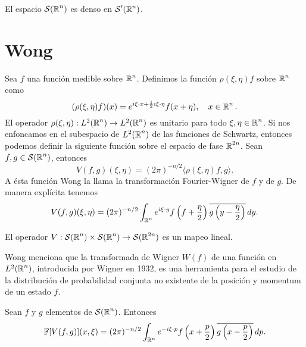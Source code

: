   \begin{proposition}
    El espacio $\operatorname{\mathcal S}(\operatorname{\mathbb{R}}^{n})$ es denso en $\operatorname{\mathcal S}'(\operatorname{\mathbb{R}}^{n})$.
  \end{proposition}

  \section{Wong}

  Sea $f$ una función medible sobre $\operatorname{\mathbb{R}}^{n}$. Definimos la
  función $\rho(\xi,\eta)f$ sobre $\operatorname{\mathbb{R}}^{n}$ como
  \begin{equation}
    (\rho(\xi,\eta)f)(x)
    = e^{i\xi \cdot x + \frac{1}{2} i \xi \cdot \eta}
    f(x+\eta),
    \quad x \in \operatorname{\mathbb{R}}^{n}.
  \end{equation}
  El operador $\rho(\xi,\eta) : L^2(\operatorname{\mathbb{R}}^{n}) \to L^2(\operatorname{\mathbb{R}}^{n})$
  es unitario para todo $\xi, \eta \in \operatorname{\mathbb{R}}^{n}$. Si nos
  enfoncamos en el subespacio de $L^2(\operatorname{\mathbb{R}}^{n})$ de las
  funciones de Schwartz, entonces podemos definir la
  siguiente función sobre el espacio de fase $\operatorname{\mathbb{R}}^{2n}$. Sean
  $f,g \in \operatorname{\mathcal S}(\operatorname{\mathbb{R}}^{n})$, entonces
  \begin{equation}
    V(f,g)(\xi,\eta)
    = (2\pi)^{-n / 2} \langle \rho(\xi,\eta)f, g \rangle.
  \end{equation}
  A ésta función Wong la llama la transformación
  Fourier-Wigner de $f$ y de $g$. De manera explícita
  tenemos 
  \begin{equation}
    V(f,g)(\xi,\eta)
    = (2\pi)^{-n / 2} \int_{\operatorname{\mathbb{R}}^{n}} e^{i \xi \cdot y}
    f\left( f + \frac{\eta}{2} \right) \overline{g\left( y -
    \frac{\eta}{2}\right) } \, dy.
  \end{equation}

  El operador $V : \operatorname{\mathcal S}(\operatorname{\mathbb{R}}^{n}) \times \operatorname{\mathcal S}(\operatorname{\mathbb{R}}^{n}) \to
  \operatorname{\mathcal S}(\operatorname{\mathbb{R}}^{2n})$ es un mapeo lineal.

  Wong menciona que la transformada de Wigner $W(f)$ de una
  función en $L^2(\operatorname{\mathbb{R}}^{n})$, introducida por Wigner en 1932,
  es una herramienta para el estudio de la distribución de
  probabilidad conjunta no existente de la posición y
  momentum de un estado $f$.

  \begin{theorem}
    Sean $f$ y $g$ elementos de $\operatorname{\mathcal S}(\operatorname{\mathbb{R}}^{n})$. Entonces
    \begin{equation}
      \operatorname{\mathbb{F}}[V(f,g)](x,\xi)
      = (2\pi)^{-n / 2} \int_{\operatorname{\mathbb{R}}^{n}} e^{-i \xi \cdot p
      } f\left( x + \frac{p}{2} \right)
      \overline{g\left( x - \frac{p}{2} \right)} \, dp.
    \end{equation}
  \end{theorem}

